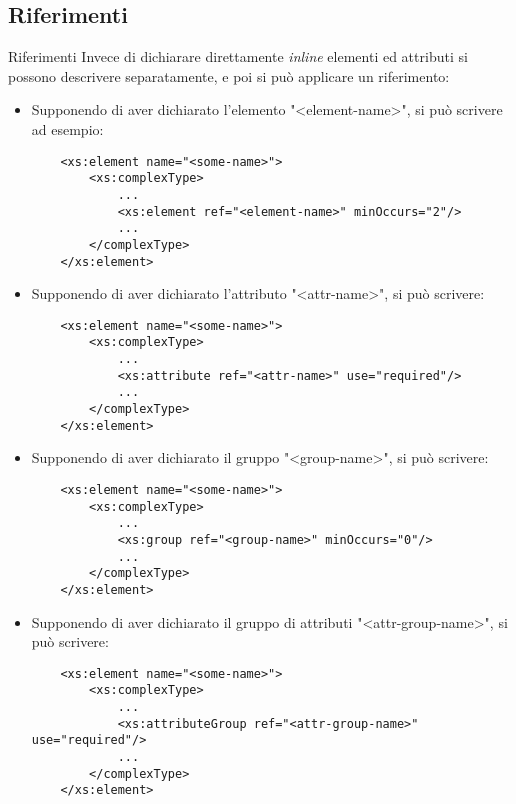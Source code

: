\documentclass{beamer}
\begin{document}
	\subsection{Riferimenti}
	\begin{frame}[containsverbatim]{Riferimenti}
	Invece di dichiarare direttamente \textit{inline} elementi ed attributi si possono descrivere separatamente, e poi si può applicare un riferimento:
	\begin{itemize}
	\item Supponendo di aver dichiarato l'elemento \textcolor{mauve}{"<element-name>"}, si può scrivere ad esempio:
	\begin{lstlisting}
	<xs:element name="<some-name>">
		<xs:complexType>
			...
			<xs:element ref="<element-name>" minOccurs="2"/>
			...
		</complexType>
	</xs:element>
	\end{lstlisting}
	\end{itemize}
	\end{frame}		
	\begin{frame}[containsverbatim]
	\begin{itemize}
	\item Supponendo di aver dichiarato l'attributo \textcolor{mauve}{"<attr-name>"}, si può scrivere:
	\begin{lstlisting}
	<xs:element name="<some-name>">
		<xs:complexType>
			...
			<xs:attribute ref="<attr-name>" use="required"/>
			...
		</complexType>
	</xs:element>
	\end{lstlisting}
	\item Supponendo di aver dichiarato il gruppo \textcolor{mauve}{"<group-name>"}, si può scrivere:
	\begin{lstlisting}
	<xs:element name="<some-name>">
		<xs:complexType>
			...
			<xs:group ref="<group-name>" minOccurs="0"/>
			...
		</complexType>
	</xs:element>
	\end{lstlisting}
	\end{itemize}
	\end{frame}
	
	\begin{frame}[containsverbatim]
	\begin{itemize}
	\item Supponendo di aver dichiarato il gruppo di attributi \textcolor{mauve}{"<attr-group-name>"}, si può scrivere:
	\begin{lstlisting}
	<xs:element name="<some-name>">
		<xs:complexType>
			...
			<xs:attributeGroup ref="<attr-group-name>" use="required"/>
			...
		</complexType>
	</xs:element>
	\end{lstlisting}
	\end{itemize}
	\end{frame}	
	
\end{document}

